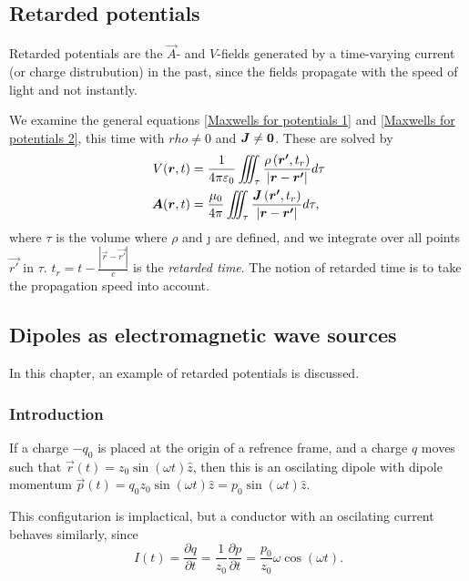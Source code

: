 \subsection{Retarded potentials}
    Retarded potentials are the $\vec{A}$- and $V$-fields generated by a time-varying current (or charge distrubution) in the past, 
    since the fields propagate with the speed of light and not instantly. 
    
    We examine the general equations \eqref{Maxwells for potentials 1} and \eqref{Maxwells for potentials 2}, this time with $rho \neq 0$ and $\bm{J} \neq \bm{0}$.
    These are solved by 
    \begin{align} 
        \label{retarded potentials 1}
        V(\bm{r}, t) &= \frac{1}{4\pi\varepsilon_0} \iiint_\tau \frac{\rho\left(\bm{r'}, t_r\right)}{|\bm{r} - \bm{r'}|}d\tau \\
        \bm{A}(\bm{r}, t) &= \frac{\mu_0}{4\pi} \iiint_\tau \frac{\bm{J}\left(\bm{r'}, t_r\right)}{|\bm{r} - \bm{r'}|}d\tau,
        \label{retarded potentials 2}
    \end{align}
    where $\tau$ is the volume where $\rho$ and \j{} are defined, 
    and we integrate over all points $\vec{r'}$ in $\tau$.
    $t_r = t - \frac{|\vec{r} - \vec{r'}|}{c}$ is the \textit{retarded time}. 
    The notion of retarded time is to take the propagation speed into account.

\subsection{Dipoles as electromagnetic wave sources}
    In this chapter, an example of retarded potentials is discussed. 

    \subsubsection*{Introduction}
        If a charge $-q_0$ is placed at the origin of a refrence frame, 
        and a charge $q$ moves such that $\vec{r}(t) = z_0 \sin\left(\omega t\right) \hat{z}$, 
        then this is an oscilating dipole with dipole momentum 
        $\vec{p}\left(t\right) = q_0 z_0 \sin\left(\omega t\right)\hat{z} = p_0 \sin\left(\omega t\right)\hat{z}$.

        This configutarion is implactical, but a conductor with an oscilating current behaves similarly, since
        \begin{equation*}
            I(t) = \frac{\partial q}{\partial t} = \frac{1}{z_0} \frac{\partial p}{\partial t} = \frac{p_0}{z_0}\omega\cos\left(\omega t\right).
        \end{equation*}
    
